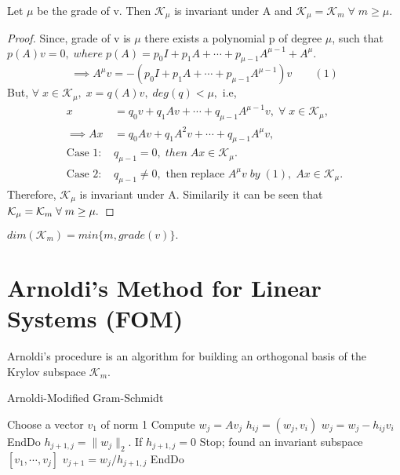 \documentclass[10pt,a4paper]{article}
\begin{document}
\begin{theorem}
Let $\mu$ be the grade of v. Then $\mathcal{K}_\mu$ is invariant under A and $\mathcal{K}_\mu = \mathcal{K}_m\;\forall\;m\ge\mu.$
\end{theorem}

\begin{proof}
Since, grade of v is $\mu$ there exists a polynomial p of degree $\mu$, such that $p(A)v=0,\;where\;p(A) = p_0I+p_1A+\cdots+p_{\mu-1}A^{\mu-1}+A^\mu.$
$$\implies A^\mu v = -(p_0I+p_1A+\cdots+p_{\mu-1}A^{\mu-1})v\qquad(1)$$
But, $\forall\;x\in\mathcal{K}_\mu,\;x=q(A)v,\;deg(q)<\mu,$ i.e,
\begin{align*}
x &= q_0v+q_1Av+\cdots+q_{\mu-1}A^{\mu-1}v,\;\forall\;x\in\mathcal{K}_\mu, \\
\implies Ax &= q_0Av+q_1A^2v+\cdots+q_{\mu-1}A^\mu v, \\
\text{Case 1: }& q_{\mu-1} = 0,\;then\;Ax\in\mathcal{K}_\mu. \\
\text{Case 2: }& q_{\mu-1} \neq 0,\text{ then replace }A^\mu v\;by\;(1),\;Ax\in\mathcal{K}_\mu.
\end{align*}
Therefore, $\mathcal{K}_\mu$ is invariant under A. Similarily it can be seen that $\mathcal{K}_\mu = \mathcal{K}_m \\
\;\forall\;m\ge\mu.$
\end{proof}

\begin{corollary}
$dim(\mathcal{K}_m) = min\{m,grade(v)\}.$
\end{corollary}

\newpage

\section{Arnoldi's Method for Linear Systems (FOM)}

Arnoldi's procedure is an algorithm for building an orthogonal basis of the Krylov subspace $\mathcal{K}_m$.

\begin{algorithm}
\caption{Arnoldi-Modified Gram-Schmidt}
\begin{algorithmic}[1]
\State Choose a vector $v_1$ of norm 1
	\State Compute $w_j = Av_j$
		\State $h_{ij} = (w_j,v_i)$
		\State $w_j = w_j - h_{ij}v_i$
	\EndFor
	\State EndDo
	\State $h_{j+1,j} = \|w_j\|_2$. 
	\State If $h_{j+1,j}=0$ Stop; found an invariant subspace $[v_1,\cdots,v_j]$
	\State $v_{j+1}=w_j/h_{j+1,j}$
\EndFor
\State EndDo
\end{algorithmic}
\end{algorithm}
\end{document}
